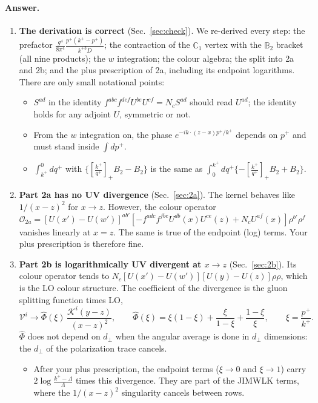 \documentclass[10pt]{article}
\numberwithin{equation}{section}
\newcommand{\KK}{\mathcal K}
\newcommand{\Ph}{\hat\Phi}
\newcommand{\OO}{\mathcal O}
\newcommand{\VV}{\mathcal V}
\def\mf#1{\mathbb{#1}}
\begin{document}
\paragraph{Answer.}
\begin{enumerate}
\item \textbf{The derivation is correct} (Sec.~\ref{sec:check}). We re-derived every step: the prefactor $\frac{g^4}{8\pi^4}\frac{p^+(k^+-p^+)}{k^{+3}D}$; the contraction of the $\mf C_1$ vertex with the $\mf B_2$ bracket (all nine products); the $w$ integration; the colour algebra; the split into 2a and 2b; and the plus prescription of 2a, including its endpoint logarithms. There are only small notational points:
\begin{itemize}
\item $S^{ad}$ in the identity $f^{abc}f^{def}U^{be}U^{cf}=N_cS^{ad}$ should read $U^{ad}$; the identity holds for any adjoint $U$, symmetric or not.
\item From the $w$ integration on, the phase $e^{-ik\cdot(z-x)p^+/k^+}$ depends on $p^+$ and must stand inside $\int dp^+$.
\item $\int_{k^+}^0dq^+$ with $\{[\frac{k^+}{q^+}]_+B_2-B_2\}$ is the same as $\int_0^{k^+}dq^+\{-[\frac{k^+}{q^+}]_+B_2+B_2\}$.
\end{itemize}
\item \textbf{Part 2a has no UV divergence} (Sec.~\ref{sec:2a}). The kernel behaves like $1/(x-z)^2$ for $x\to z$. However, the colour operator $\OO_{2a}=[U(x')-U(w')]^{ab'}[-f^{adc}f^{fbe}U^{db}(x)U^{ce}(z)+N_cU^{af}(x)]\rho^{b'}\rho^f$ vanishes linearly at $x=z$. The same is true of the endpoint (log) terms. Your plus prescription is therefore fine.
\item \textbf{Part 2b is logarithmically UV divergent at $x\to z$} (Sec.~\ref{sec:2b}). Its colour operator tends to $N_c[U(x')-U(w')][U(y)-U(z)]\rho\rho$, which is the LO colour structure. The coefficient of the divergence is the gluon splitting function times LO,
\begin{equation*}
\VV^i\to\Ph(\xi)\,\frac{\KK^i(y-z)}{(x-z)^2},\qquad \Ph(\xi)=\xi(1-\xi)+\frac{\xi}{1-\xi}+\frac{1-\xi}{\xi},\qquad \xi=\frac{p^+}{k^+}.
\end{equation*}
$\Ph$ does not depend on $d_\perp$ when the angular average is done in $d_\perp$ dimensions: the $d_\perp$ of the polarization trace cancels.
\begin{itemize}
\item After your plus prescription, the endpoint terms ($\xi\to0$ and $\xi\to1$) carry $2\log\frac{k^+-\Lambda}{\Lambda}$ times this divergence. They are part of the JIMWLK terms, where the $1/(x-z)^2$ singularity cancels between rows.

\end{itemize}
\end{enumerate}
\end{document}
